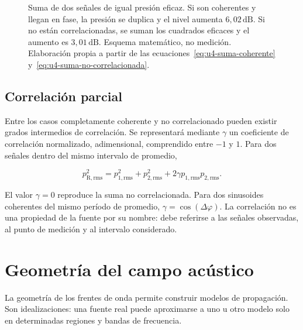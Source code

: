 \begin{figure}[htbp]
    \centering
    
    \caption{Suma de dos señales de igual presión eficaz. Si son coherentes y
    llegan en fase, la presión se duplica y el nivel aumenta
    \(6{,}02\,\text{dB}\). Si no están correlacionadas, se suman los cuadrados
    eficaces y el aumento es \(3{,}01\,\text{dB}\). Esquema matemático, no
    medición. Elaboración propia a partir de las
    ecuaciones~\eqref{eq:u4-suma-coherente}
    y~\eqref{eq:u4-suma-no-correlacionada}.}
    \label{fig:u4-suma-coherente-no-correlacionada}
\end{figure}

\subsection{Correlación parcial}
\label{sec:u4-correlacion-parcial}

Entre los casos completamente coherente y no correlacionado pueden existir
grados intermedios de correlación. Se representará mediante \(\gamma\) un
coeficiente de correlación normalizado, adimensional, comprendido entre
\(-1\) y \(1\). Para dos señales dentro del mismo intervalo de promedio,

\begin{equation}
    p_{\mathrm{R,rms}}^2
      =p_{1,\mathrm{rms}}^2+p_{2,\mathrm{rms}}^2
       +2\gamma p_{1,\mathrm{rms}}p_{2,\mathrm{rms}}.
    \label{eq:u4-suma-correlacion-parcial}
\end{equation}

El valor \(\gamma=0\) reproduce la suma no correlacionada. Para dos sinusoides
coherentes del mismo período de promedio,
\(\gamma=\cos(\Delta\varphi)\). La correlación no es una propiedad de la
fuente por su nombre: debe referirse a las señales observadas, al punto de
medición y al intervalo considerado.

\section{Geometría del campo acústico}
\label{sec:u4-geometria-campo}

La geometría de los frentes de onda permite construir modelos de propagación.
Son idealizaciones: una fuente real puede aproximarse a uno u otro modelo solo
en determinadas regiones y bandas de frecuencia.


